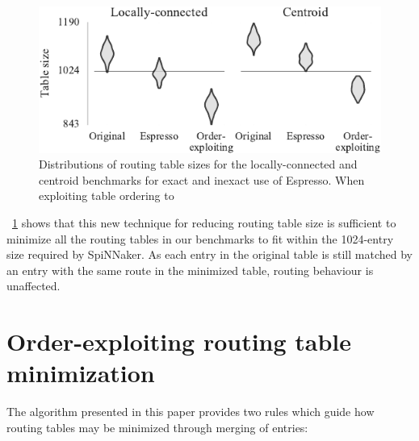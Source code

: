 \documentclass[conference]{IEEEtran}
\begin{document}
\begin{figure}
  \centering
  \includegraphics{experiments/results_with_dc}
  \caption{
    Distributions of routing table sizes for the locally-connected and centroid benchmarks for exact and inexact use of Espresso.
    When exploiting table ordering to 
  }
  \label{fig:results/espresso_with_dc}
\end{figure}

\figurename~\ref{fig:results/espresso_with_dc} shows that this new technique for reducing routing table size is sufficient to minimize all the routing tables in our benchmarks to fit within the 1024-entry size required by SpiNNaker.
As each entry in the original table is still matched by an entry with the same route in the minimized table, routing behaviour is unaffected.

\section{Order-exploiting routing table minimization}

  The algorithm presented in this paper provides two rules which guide how routing tables may be minimized through merging of entries:
\end{document}
